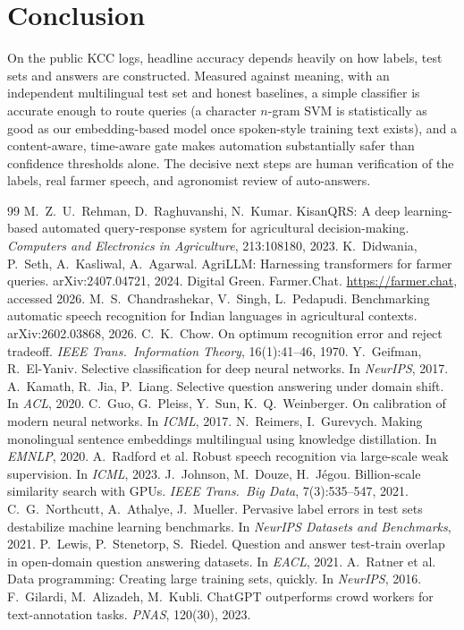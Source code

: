 \documentclass[11pt]{article}
\begin{document}
\section{Conclusion}
On the public KCC logs, headline accuracy depends heavily on how labels, test sets and answers are constructed. Measured against meaning, with an independent multilingual test set and honest baselines, a simple classifier is accurate enough to route queries (a character $n$-gram SVM is statistically as good as our embedding-based model once spoken-style training text exists), and a content-aware, time-aware gate makes automation substantially safer than confidence thresholds alone. The decisive next steps are human verification of the labels, real farmer speech, and agronomist review of auto-answers.

\begin{thebibliography}{99}\small
{} M.~Z.~U.~Rehman, D.~Raghuvanshi, N.~Kumar. KisanQRS: A deep learning-based automated query-response system for agricultural decision-making. \emph{Computers and Electronics in Agriculture}, 213:108180, 2023.
 K.~Didwania, P.~Seth, A.~Kasliwal, A.~Agarwal. AgriLLM: Harnessing transformers for farmer queries. arXiv:2407.04721, 2024.
 Digital Green. Farmer.Chat. \url{https://farmer.chat}, accessed 2026.
 M.~S.~Chandrashekar, V.~Singh, L.~Pedapudi. Benchmarking automatic speech recognition for Indian languages in agricultural contexts. arXiv:2602.03868, 2026.
 C.~K.~Chow. On optimum recognition error and reject tradeoff. \emph{IEEE Trans.\ Information Theory}, 16(1):41--46, 1970.
 Y.~Geifman, R.~El-Yaniv. Selective classification for deep neural networks. In \emph{NeurIPS}, 2017.
 A.~Kamath, R.~Jia, P.~Liang. Selective question answering under domain shift. In \emph{ACL}, 2020.
 C.~Guo, G.~Pleiss, Y.~Sun, K.~Q.~Weinberger. On calibration of modern neural networks. In \emph{ICML}, 2017.
 N.~Reimers, I.~Gurevych. Making monolingual sentence embeddings multilingual using knowledge distillation. In \emph{EMNLP}, 2020.
 A.~Radford et al. Robust speech recognition via large-scale weak supervision. In \emph{ICML}, 2023.
 J.~Johnson, M.~Douze, H.~J\'egou. Billion-scale similarity search with GPUs. \emph{IEEE Trans.\ Big Data}, 7(3):535--547, 2021.
 C.~G.~Northcutt, A.~Athalye, J.~Mueller. Pervasive label errors in test sets destabilize machine learning benchmarks. In \emph{NeurIPS Datasets and Benchmarks}, 2021.
 P.~Lewis, P.~Stenetorp, S.~Riedel. Question and answer test-train overlap in open-domain question answering datasets. In \emph{EACL}, 2021.
 A.~Ratner et al. Data programming: Creating large training sets, quickly. In \emph{NeurIPS}, 2016.
 F.~Gilardi, M.~Alizadeh, M.~Kubli. ChatGPT outperforms crowd workers for text-annotation tasks. \emph{PNAS}, 120(30), 2023.
\end{thebibliography}
\end{document}
